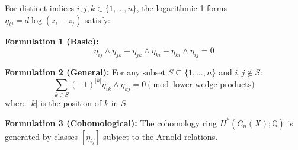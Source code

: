 \begin{theorem}\label{thm:arnold-three}
For distinct indices $i, j, k \in \{1, \ldots, n\}$, the logarithmic 1-forms $\eta_{ij} = d\log(z_i - z_j)$ satisfy:

\textbf{Formulation 1 (Basic):}
$$\eta_{ij} \wedge \eta_{jk} + \eta_{jk} \wedge \eta_{ki} + \eta_{ki} \wedge \eta_{ij} = 0$$

\textbf{Formulation 2 (General):}
For any subset $S \subseteq \{1, \ldots, n\}$ and $i, j \notin S$:
$$\sum_{k \in S} (-1)^{|k|} \eta_{ik} \wedge \eta_{kj} = 0 \pmod{\text{lower wedge products}}$$
where $|k|$ is the position of $k$ in $S$.

\textbf{Formulation 3 (Cohomological):}
The cohomology ring $H^*(\overline{C}_n(X); \mathbb{Q})$ is generated by classes $[\eta_{ij}]$ subject to the Arnold relations.
\end{theorem}

